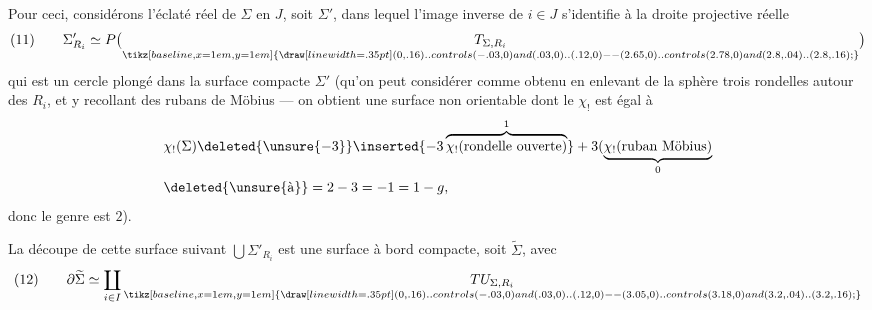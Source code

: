 Pour ceci, considérons l'éclaté réel de $\Sigma$ en $J$, soit $\Sigma'$, dans lequel l'image inverse de $i\in J$ s'identifie à  la droite projective réelle
\[
(11)\qquad\Sigma'_{R_i}\simeq P\bigl(\underset{\tikz[baseline,x=1em,y=1em]{\draw[line width=.35pt] (0,.16) .. controls (-.03,0) and (.03,0) .. (.12,0) -- (2.65,0) .. controls (2.78,0) and (2.8,.04) .. (2.8,.16);}}{T_{\Sigma,R_i}}\bigr)
\]
qui est un cercle plongé dans la surface compacte $\Sigma'$ (qu'on peut considérer comme obtenu en enlevant de la sphère trois rondelles autour des $R_i$, et y recollant des rubans de Möbius --- on obtient une surface non orientable dont le  $\chi_!$ est égal à
\[
\begin{aligned}
&\chi_!(\Sigma)\deleted{\unsure{-3}}\inserted{-3\overbrace{\chi_!(\text{rondelle ouverte})}^{1}}+3(\underbrace{\chi_!(\text{ruban Möbius})}_{0}\\
&\deleted{\unsure{\text{à}}}=2-3=-1=1-g,
\end{aligned}
\]
donc le genre est $2$).

La découpe de cette surface suivant $\bigcup\Sigma'_{R_i}$ est une surface à bord compacte,   soit $\widetilde\Sigma$, avec
\[
(12)\qquad\partial\widetilde\Sigma\simeq\coprod_{i\in I}\underset{\tikz[baseline,x=1em,y=1em]{\draw[line width=.35pt] (0,.16) .. controls (-.03,0) and (.03,0) .. (.12,0) -- (3.05,0) .. controls (3.18,0) and (3.2,.04) .. (3.2,.16);}}{TU_{\Sigma,R_i}}
\]

